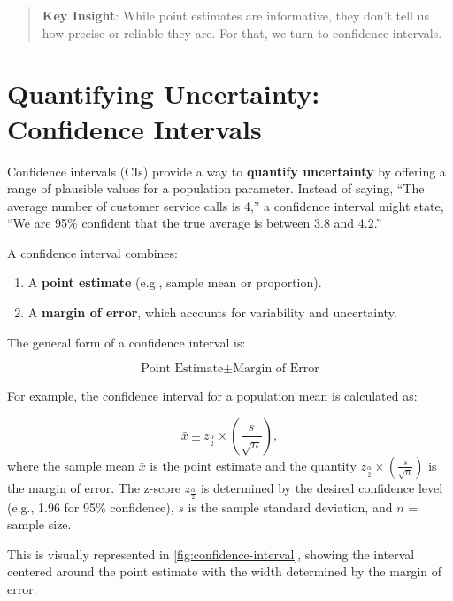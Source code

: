 \documentclass[
]{book}
\providecommand{\tightlist}{%
  \setlength{\itemsep}{0pt}\setlength{\parskip}{0pt}}
\theoremstyle{definition}
\theoremstyle{definition}
\theoremstyle{definition}
\theoremstyle{definition}
\theoremstyle{remark}
\begin{document}
\begin{quote}
\textbf{Key Insight}: While point estimates are informative, they don't tell us how precise or reliable they are. For that, we turn to confidence intervals.
\end{quote}

\section{Quantifying Uncertainty: Confidence Intervals}\label{quantifying-uncertainty-confidence-intervals}

Confidence intervals (CIs) provide a way to \textbf{quantify uncertainty} by offering a range of plausible values for a population parameter. Instead of saying, ``The average number of customer service calls is 4,'' a confidence interval might state, ``We are 95\% confident that the true average is between 3.8 and 4.2.''

A confidence interval combines:

\begin{enumerate}
\def\labelenumi{\arabic{enumi}.}
\tightlist
\item
  A \textbf{point estimate} (e.g., sample mean or proportion).
\item
  A \textbf{margin of error}, which accounts for variability and uncertainty.
\end{enumerate}

The general form of a confidence interval is:

\[
\text{Point Estimate}  \pm \text{Margin of Error}
\]

For example, the confidence interval for a population mean is calculated as:

\[
\bar{x} \pm z_{\frac{\alpha}{2}} \times \left( \frac{s}{\sqrt{n}} \right),
\]
where the sample mean \(\bar{x}\) is the point estimate and the quantity \(z_{\frac{\alpha}{2}} \times \left( \frac{s}{\sqrt{n}} \right)\) is the margin of error. The z-score \(z_{\frac{\alpha}{2}}\) is determined by the desired confidence level (e.g., 1.96 for 95\% confidence), \(s\) is the sample standard deviation, and \(n\) = sample size.

This is visually represented in \ref{fig:confidence-interval}, showing the interval centered around the point estimate with the width determined by the margin of error.
\end{document}
